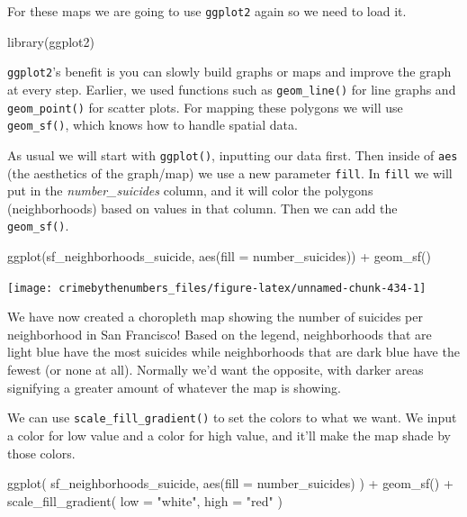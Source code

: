\documentclass[
  a4paper,
]{krantz}
\makeatletter
\newenvironment{Shaded}{\begin{snugshade}}{\end{snugshade}}
\newcommand{\AttributeTok}[1]{\textcolor[rgb]{0.77,0.63,0.00}{#1}}
\newcommand{\FunctionTok}[1]{\textcolor[rgb]{0.00,0.00,0.00}{#1}}
\newcommand{\NormalTok}[1]{#1}
\newcommand{\SpecialCharTok}[1]{\textcolor[rgb]{0.00,0.00,0.00}{#1}}
\newcommand{\StringTok}[1]{\textcolor[rgb]{0.31,0.60,0.02}{#1}}
\newenvironment{kframe}{%
\medskip{}
\setlength{\fboxsep}{.8em}
 \def\at@end@of@kframe{}%
 \ifinner\ifhmode%
  \def\at@end@of@kframe{\end{minipage}}%
  \begin{minipage}{\columnwidth}%
 \fi\fi%
 \def\FrameCommand##1{\hskip\@totalleftmargin \hskip-\fboxsep
 \colorbox{shadecolor}{##1}\hskip-\fboxsep
     \hskip-\linewidth \hskip-\@totalleftmargin \hskip\columnwidth}%
 \MakeFramed {\advance\hsize-\width
   \@totalleftmargin\z@ \linewidth\hsize
   \@setminipage}}%
 {\par\unskip\endMakeFramed%
 \at@end@of@kframe}
\renewenvironment{Shaded}{\begin{kframe}}{\end{kframe}}
\makeatother
\begin{document}
For these maps we are going to use \texttt{ggplot2} again so
we need to load it.

\begin{Shaded}
\begin{Highlighting}[]
\FunctionTok{library}\NormalTok{(ggplot2)}
\end{Highlighting}
\end{Shaded}

\texttt{ggplot2}'s benefit is you can slowly build graphs or
maps and improve the graph at every step. Earlier, we used
functions such as \texttt{geom\_line()} for line graphs and
\texttt{geom\_point()} for scatter plots. For mapping these
polygons we will use \texttt{geom\_sf()}, which knows how to
handle spatial data.

As usual we will start with \texttt{ggplot()}, inputting our
data first. Then inside of \texttt{aes} (the aesthetics of
the graph/map) we use a new parameter \texttt{fill}. In
\texttt{fill} we will put in the \emph{number\_suicides}
column, and it will color the polygons (neighborhoods) based
on values in that column. Then we can add the
\texttt{geom\_sf()}.

\begin{Shaded}
\begin{Highlighting}[]
\FunctionTok{ggplot}\NormalTok{(sf\_neighborhoods\_suicide, }\FunctionTok{aes}\NormalTok{(}\AttributeTok{fill =}\NormalTok{ number\_suicides)) }\SpecialCharTok{+}
  \FunctionTok{geom\_sf}\NormalTok{()}
\end{Highlighting}
\end{Shaded}

\begin{center}\texttt{[image: crimebythenumbers\_files/figure-latex/unnamed-chunk-434-1]} \end{center}

We have now created a choropleth map showing the number of
suicides per neighborhood in San Francisco! Based on the
legend, neighborhoods that are light blue have the most
suicides while neighborhoods that are dark blue have the
fewest (or none at all). Normally we'd want the opposite,
with darker areas signifying a greater amount of whatever
the map is showing.

We can use \texttt{scale\_fill\_gradient()} to set the
colors to what we want. We input a color for low value and a
color for high value, and it'll make the map shade by those
colors.

\begin{Shaded}
\begin{Highlighting}[]
\FunctionTok{ggplot}\NormalTok{(}
\NormalTok{  sf\_neighborhoods\_suicide,}
  \FunctionTok{aes}\NormalTok{(}\AttributeTok{fill =}\NormalTok{ number\_suicides)}
\NormalTok{) }\SpecialCharTok{+}
  \FunctionTok{geom\_sf}\NormalTok{() }\SpecialCharTok{+}
  \FunctionTok{scale\_fill\_gradient}\NormalTok{(}
    \AttributeTok{low =} \StringTok{"white"}\NormalTok{,}
    \AttributeTok{high =} \StringTok{"red"}
\NormalTok{  )}
\end{Highlighting}
\end{Shaded}
\end{document}
